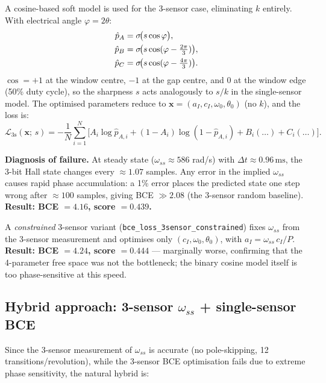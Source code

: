\documentclass[11pt,a4paper]{article}
\begin{document}
A cosine-based soft model is used for the 3-sensor case, eliminating $k$
entirely.  With electrical angle $\varphi = 2\theta$:
\begin{align}
  \hat{p}_A &= \sigma\!\bigl(s\cos\varphi\bigr), \notag\\
  \hat{p}_B &= \sigma\!\bigl(s\cos(\varphi - \tfrac{2\pi}{3})\bigr), \notag\\
  \hat{p}_C &= \sigma\!\bigl(s\cos(\varphi - \tfrac{4\pi}{3})\bigr). \notag
\end{align}
$\cos = +1$ at the window centre, $-1$ at the gap centre, and $0$ at the
window edge (50\% duty cycle), so the sharpness $s$ acts analogously to
$s/k$ in the single-sensor model.  The optimised parameters reduce to
$\mathbf{x} = (a_I, c_I, \omega_0, \theta_0)$ (no $k$), and the loss is:
\begin{equation}
  \mathcal{L}_{\text{3s}}(\mathbf{x};\,s)
  = -\frac{1}{N}\sum_{i=1}^{N}
    \bigl[A_i\log\hat{p}_{A,i} + (1-A_i)\log(1-\hat{p}_{A,i})
         + B_i(\ldots) + C_i(\ldots)\bigr].
\end{equation}

\textbf{Diagnosis of failure.}  At steady state ($\omega_{ss}\approx 586$
rad/s) with $\Delta t \approx 0.96\,\text{ms}$, the 3-bit Hall state changes
every $\approx 1.07$ samples.  Any error in the implied $\omega_{ss}$ causes
rapid phase accumulation: a 1\% error places the predicted state one step
wrong after $\approx 100$ samples, giving BCE $\gg 2.08$ (the 3-sensor random
baseline).  \textbf{Result: BCE $=4.16$, score $=0.439$.}

A \emph{constrained} 3-sensor variant (\texttt{bce\_loss\_3sensor\_constrained})
fixes $\omega_{ss}$ from the 3-sensor measurement and optimises only
$(c_I,\omega_0,\theta_0)$, with $a_I = \omega_{ss}\,c_I/P$.
\textbf{Result: BCE $=4.24$, score $=0.444$} --- marginally worse, confirming
that the 4-parameter free space was not the bottleneck; the binary cosine model
itself is too phase-sensitive at this speed.

\subsection{Hybrid approach: 3-sensor $\omega_{ss}$ + single-sensor BCE}

Since the 3-sensor measurement of $\omega_{ss}$ is accurate (no pole-skipping,
12 transitions/revolution), while the 3-sensor BCE optimisation fails due to
extreme phase sensitivity, the natural hybrid is:
\end{document}
